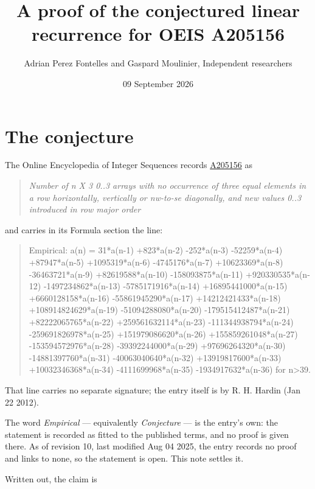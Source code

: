 \documentclass[11pt]{article}
\title{A proof of the conjectured linear recurrence for OEIS A205156}
\author{Adrian Perez Fontelles and Gaspard Moulinier, Independent researchers}
\date{09 September 2026}
\theoremstyle{definition}
\begin{document}
\maketitle
\section{The conjecture}

The Online Encyclopedia of Integer Sequences records \href{https://oeis.org/A205156}{A205156} as

\begin{quote}\itshape Number of n X 3 0..3 arrays with no occurrence of three equal elements in a row horizontally, vertically or nw-to-se diagonally, and new values 0..3 introduced in row major order\end{quote}

and carries in its Formula section the line:

\begin{quote}\ttfamily Empirical: a(n) = 31*a(n-1) +823*a(n-2) -252*a(n-3) -52259*a(n-4) +87947*a(n-5) +1095319*a(n-6) -4745176*a(n-7) +10623369*a(n-8) -36463721*a(n-9) +82619588*a(n-10) -158093875*a(n-11) +920330535*a(n-12) -1497234862*a(n-13) -5785171916*a(n-14) +16895441000*a(n-15) +6660128158*a(n-16) -55861945290*a(n-17) +14212421433*a(n-18) +108914824629*a(n-19) -51094288080*a(n-20) -179515412487*a(n-21) +82222065765*a(n-22) +259561632114*a(n-23) -111344938794*a(n-24) -259691826978*a(n-25) +151979086620*a(n-26) +155859261048*a(n-27) -153594572976*a(n-28) -39392244000*a(n-29) +97696264320*a(n-30) -14881397760*a(n-31) -40063040640*a(n-32) +13919817600*a(n-33) +10032346368*a(n-34) -4111699968*a(n-35) -1934917632*a(n-36) for n>39.\end{quote}

That line carries no separate signature; the entry itself is by R. H. Hardin (Jan 22 2012).

The word {\itshape Empirical} --- equivalently {\itshape Conjecture} --- is the entry's own: the statement is recorded as fitted to the published terms, and no proof is given there. As of revision 10, last modified Aug 04 2025, the entry records no proof and links to none, so the statement is open. This note settles it.

Written out, the claim is
\end{document}
